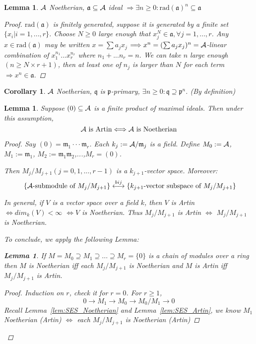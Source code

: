 \documentclass[11pt]{article}
\newtheorem{lemma}[thm]{Lemma}
\newtheorem{cor}[thm]{Corollary}
\newcommand{\sca}{{\mathfrak a}}
\newcommand{\scm}{{\mathfrak m}}
\newcommand{\scp}{{\mathfrak p}}
\newcommand{\scq}{\mathfrak q}
\newcommand{\cala}{{\cal A}}
\newcommand{\Lrta}{\Longrightarrow}
\newcommand{\lrta}{\longrightarrow}
\newcommand{\llrta}{\longleftrightarrow}
\newcommand{\Llrta}{\Longleftrightarrow}
\begin{document}
\begin{lemma}\label{lem:ideal_radical_Noetherian}
$\cala$ Noetherian, $\sca\subseteq \cala$ ideal $\Lrta \exists n\geq 0: \text{rad}(\sca)^n\subseteq \sca$
\begin{proof}
$\text{rad}(\sca)$ is finitely generated, suppose it is generated by a finite set $\{x_i|i=1,...,r\}$. Choose $N\geq 0$ large enough that $x_j^N\in\sca,\forall j=1,...,r$. Any $x\in \text{rad}(\sca)$ may be written $x=\sum a_j x_j$ $\Lrta x^n=(\sum a_j x_j)^n=\cala$-linear combination of $x_1^{n_1}...x_r^{n_r} $ where $n_1+...n_r=n$. We can take $n$ large enough $(n\geq N\times r+1)$, then at least one of $n_j$ is larger than $N$ for each term $\Lrta x^n\in\sca$.
\end{proof}
\end{lemma}

\begin{cor}
$\cala$ Noetherian, $\scq$  is $\scp$-primary, $\exists n\geq 0:\scq\supseteq \scp^n$. (By definition)
\end{cor}

\begin{lemma}\label{lem:Artin_Noetherin_product_of_maximals}
Suppose $(0)\subseteq \cala$ is a finite product of maximal ideals. Then under this assumption, 
$$
\cala\text{ is Artin}\Llrta \cala\text{ is Noetherian}
$$
\begin{proof}
Say $(0)=\scm_1\cdot \cdot \cdot \scm_r$. Each $k_j:=\cala/\scm_j$ is a field. Define $M_0:=\cala$, $M_1:=\scm_1$, $M_2:=\scm_1\scm_2$,...,$M_r=(0)$.

Then $M_j/M_{j+1} (j=0,1,...,r-1)$ is a $k_{j+1}$-vector space. Moreover: 
$$
\text{
\{$\cala$-submodule of $M_j/M_{j+1}$\}}
\overset{bij}{\llrta}
\text{\{$k_{j+1}$-vector subspace of $M_j/M_{j+1}$\}}
$$

In general, if $V$ is a vector space over a field $k$, then $V$ is Artin $\Llrta dim_k(V)<\infty$ $\Llrta V$ is Noetherian. Thus $M_j/M_{j+1}$ is Artin $\Llrta$ $M_j/M_{j+1}$ is Noetherian.

To conclude, we apply the following Lemma:
\begin{lemma}
If $M=M_0\supseteq M_1\supseteq ...\supseteq M_r=\{0\}$ is a chain of modules over a ring then $M$ is Noetherian iff each $M_j/M_{j+1}$ is Noetherian and $M$ is Artin iff $M_j/M_{j+1}$ is Artin.
\begin{proof}
Induction on $r$, check it for $r=0$.
For $r\geq 1$, 
$$
0\lrta M_1\lrta M_0\lrta M_0/M_1\lrta 0
$$ Recall Lemma~\ref{lem:SES_Noetherian} and Lemma~\ref{lem:SES_Artin}, we know $M_1$ Noetherian (Artin) $\Llrta$ each $M_j/M_{j+1}$ is Noetherian (Artin)
\end{proof}
\end{lemma}
\end{proof}
\end{lemma}
\end{document}
